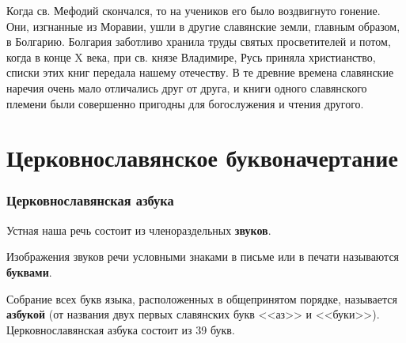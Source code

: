 \documentclass[11pt,a4paper,oneside]{memoir}
\begin{document}
        Когда св. Мефодий скончался, то на учеников его было
        воздвигнуто гонение. Они, изгнанные из Моравии, ушли в другие
        славянские земли, главным образом, в Болгарию. Болгария
        заботливо хранила труды святых просветителей и потом, когда в
        конце X века, при св. князе Владимире, Русь приняла
        христианство, списки этих книг передала нашему отечеству. В
        те древние времена славянские наречия очень мало отличались
        друг от друга, и книги одного славянского племени были
        совершенно пригодны для богослужения и чтения другого.

        \section{Церковнославянское буквоначертание}
        \subsubsection{Церковнославянская азбука}

        Устная наша речь состоит из членораздельных \textbf{звуков}.

        Изображения звуков речи условными знаками в письме или в
        печати называются \textbf{буквами}.

        Собрание всех букв языка, расположенных в общепринятом
        порядке, называется \textbf{азбукой} (от названия двух первых
        славянских букв <<аз>> и <<буки>>). Церковнославянская азбука
        состоит из 39 букв.
\end{document}
